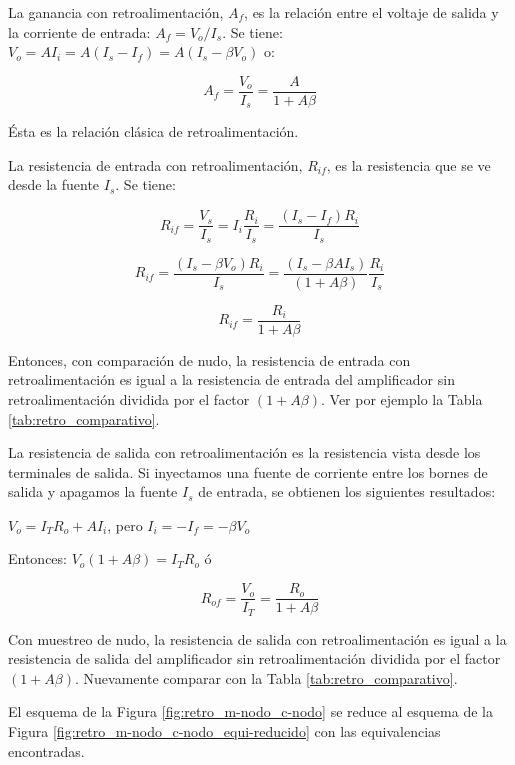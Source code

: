 La ganancia con retroalimentación, $A_f$, es la relación entre el voltaje de salida y la corriente de entrada: $A_f = V_o / I_s$. Se tiene: \( V_o = A I_i = A (I_s - I_f) = A (I_s - \beta V_o) \) o:

\begin{equation}
	A_f = \frac{V_o}{I_s} = \frac{A}{1 + A\beta}
	\label{equ:retro_ganancia}
\end{equation}

Ésta es la relación clásica de retroalimentación.

La resistencia de entrada con retroalimentación, $R_{if}$, es la resistencia que se ve desde la fuente $I_s$. Se tiene:

\[
R_{if} = \frac{V_s}{I_s} = I_i \frac{R_i}{I_s} = \frac{(I_s - I_f) R_i}{I_s}
\]

\[
R_{if} = \frac{(I_s - \beta V_o) R_i}{I_s} = \frac{(I_s - \beta A I_s)}{(1 + A \beta)} \frac{R_i}{I_s}
\]

\begin{equation}
	R_{if} = \frac{R_i}{1 + A \beta}
	\label{equ:retro_rif}
\end{equation}

Entonces, con comparación de nudo, la resistencia de entrada con retroalimentación es igual a la resistencia de entrada del amplificador sin retroalimentación dividida por el factor $(1 + A \beta)$. Ver por ejemplo la Tabla \ref{tab:retro_comparativo}.

La resistencia de salida con retroalimentación es la resistencia vista desde los terminales de salida. Si inyectamos una fuente de corriente entre los bornes de salida y apagamos la fuente \( I_s \) de entrada, se obtienen los siguientes resultados:

\( V_o = I_T R_o + A I_i\), pero  \(I_i = -I_f = -\beta V_o \)

Entonces: \( V_o (1 + A \beta) = I_T R_o \) ó

\begin{equation}
	R_{of} = \frac{V_o}{I_T} = \frac{R_o}{1 + A \beta}
	\label{equ:retro_rof}
\end{equation}

Con muestreo de nudo, la resistencia de salida con retroalimentación es igual a la resistencia de salida del amplificador sin retroalimentación dividida por el factor \( (1 + A \beta) \). Nuevamente comparar con la Tabla \ref{tab:retro_comparativo}.

El esquema de la Figura \ref{fig:retro_m-nodo_c-nodo} se reduce al esquema de la Figura \ref{fig:retro_m-nodo_c-nodo_equi-reducido} con las equivalencias encontradas.


